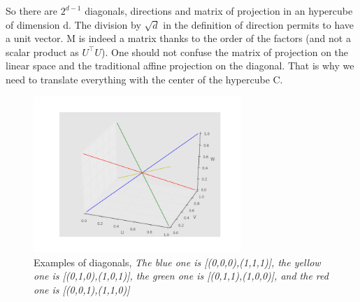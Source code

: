 \documentclass{article}
\begin{document}
	
	So there are \begin{math} 2^{d-1}\end{math} diagonals, directions and matrix of projection in an hypercube of dimension d.\newline
	\newline
	The division by \begin{math} \sqrt{d} \end{math} in the definition of direction permits to have a unit vector.\newline
	\newline
	M is indeed a matrix thanks to the order of the factors (and not a scalar product as \begin{math} U^\top U \end{math}).\newline
	\newline
	One should not confuse the matrix of projection on the linear space and the traditional affine projection on the diagonal. That is why we need to translate everything with the center of the hypercube C.
	\newline
	\begin{figure}
  
    \includegraphics[width=0.7\textwidth]{Diagonals3d.png}
    \caption{Examples of diagonals, \emph{The blue one is [(0,0,0),(1,1,1)], the yellow one is [(0,1,0),(1,0,1)], the green one is [(0,1,1),(1,0,0)],  and the red one is [(0,0,1),(1,1,0)] }}
\end{figure}
\end{document}
